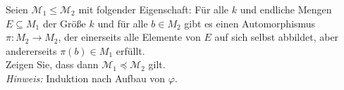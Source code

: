 
\begin{exercise}[203]

Seien $\mathscr{M}_1 \leq \mathscr{M}_2$ mit folgender Eigenschaft: Für alle $k$
und endliche Mengen $E \subseteq M_1$ der Größe $k$ und für alle $b \in M_2$
gibt es einen Automorphismus $\pi: M_2 \to M_2$, der einerseits alle Elemente von
$E$ auf sich selbst abbildet, aber andererseits $\pi(b) \in M_1$ erfüllt. \\
Zeigen Sie, dass dann $\mathscr{M}_1 \preccurlyeq \mathscr{M}_2$ gilt. \\
\textit{Hinweis:} Induktion nach Aufbau von $\varphi$.
\end{exercise}


\begin{solution}

  \phantom{}

\end{solution}
